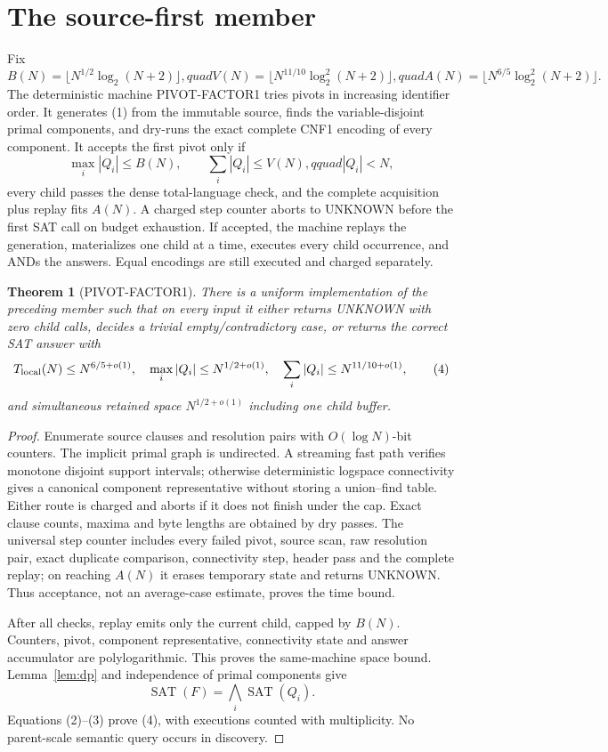\documentclass[11pt]{article}
\newtheorem{theorem}{Theorem}
\newcommand{\SAT}{\operatorname{SAT}}
\begin{document}
\section{The source-first member}

Fix
\[
 B(N)=\lfloor N^{1/2}\log_2(N+2)\rfloor,quad
 V(N)=\lfloor N^{11/10}\log_2^2(N+2)\rfloor,quad
 A(N)=\lfloor N^{6/5}\log_2^2(N+2)\rfloor.                 \tag{2}
\]
The deterministic machine \textsc{PIVOT-FACTOR1} tries pivots in increasing
identifier order.  It generates (1) from the immutable source, finds the
variable-disjoint primal components, and dry-runs the exact complete CNF1
encoding of every component.  It accepts the first pivot only if
\[
 \max_i |Q_i|\le B(N),\qquad
 \sum_i|Q_i|\le V(N),qquad |Q_i|<N,                       \tag{3}
\]
every child passes the dense total-language check, and the complete
acquisition plus replay fits $A(N)$.  A charged step counter aborts to
UNKNOWN before the first SAT call on budget exhaustion.  If accepted, the
machine replays the generation, materializes one child at a time, executes
every child occurrence, and ANDs the answers.  Equal encodings are still
executed and charged separately.

\begin{theorem}[PIVOT-FACTOR1]\label{thm:member}
There is a uniform implementation of the preceding member such that on every
input it either returns UNKNOWN with zero child calls, decides a trivial
empty/contradictory case, or returns the correct SAT answer with
\[
 T_{\rm local}(N)\le N^{6/5+o(1)},\quad
 \max_i|Q_i|\le N^{1/2+o(1)},\quad
 \sum_i|Q_i|\le N^{11/10+o(1)},                            \tag{4}
\]
and simultaneous retained space $N^{1/2+o(1)}$ including one child buffer.
\end{theorem}
\begin{proof}
Enumerate source clauses and resolution pairs with $O(\log N)$-bit counters.
The implicit primal graph is undirected.  A streaming fast path verifies
monotone disjoint support intervals; otherwise deterministic logspace
connectivity gives a canonical component representative without storing a
union--find table.  Either route is charged and aborts if it does not finish
under the cap.  Exact clause counts, maxima and byte lengths are obtained by
dry passes.  The universal step counter includes every failed pivot, source
scan, raw resolution pair, exact duplicate comparison, connectivity step,
header pass and the complete replay;
on reaching $A(N)$ it erases temporary state and returns UNKNOWN.  Thus
acceptance, not an average-case estimate, proves the time bound.

After all checks, replay emits only the current child, capped by $B(N)$.
Counters, pivot, component representative, connectivity state and answer
accumulator are polylogarithmic.  This proves the same-machine space bound.
Lemma~\ref{lem:dp} and independence of primal components give
\[
 \SAT(F)=\bigwedge_i\SAT(Q_i).
\]
Equations (2)--(3) prove (4), with executions counted with multiplicity.
No parent-scale semantic query occurs in discovery.
\end{proof}
\end{document}
